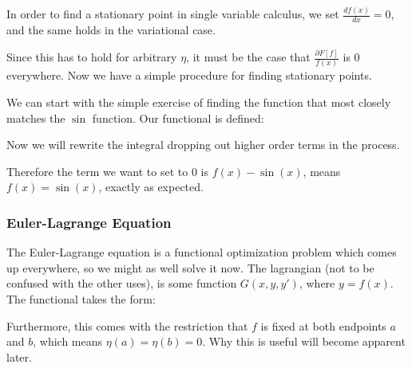 \documentclass[12pt]{article}
\begin{document}

In order to find a stationary point in single variable calculus, we set $\frac{df(x)}{dx} = 0$, and the same holds in the variational case.


Since this has to hold for arbitrary $\eta$, it must be the case that $\frac{\partial F[f]}{f(x)}$ is 0 everywhere. Now we have a simple procedure for finding stationary points.



We can start with the simple exercise of finding the function that most closely matches the $\sin$ function. Our functional is defined:


Now we will rewrite the integral dropping out higher order terms in the process.


Therefore the term we want to set to 0 is $f(x)-\sin(x)$, means $f(x) = \sin(x)$, exactly as expected.

\subsubsection{Euler-Lagrange Equation}

The Euler-Lagrange equation is a functional optimization problem which comes up everywhere, so we might as well solve it now. The lagrangian (not to be confused with the other uses), is some function $G(x, y, y')$, where $y = f(x)$. The functional takes the form:


Furthermore, this comes with the restriction that $f$ is fixed at both endpoints $a$ and $b$, which means $\eta(a) = \eta(b) = 0$. Why this is useful will become apparent later.
\end{document}
